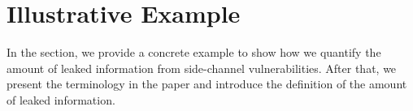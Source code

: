 \section{Illustrative Example}
In the section, we provide a concrete example to show how we 
quantify the amount of leaked information from side-channel
vulnerabilities. After that, we present the terminology in the
paper and introduce the definition of the amount of 
leaked information.
